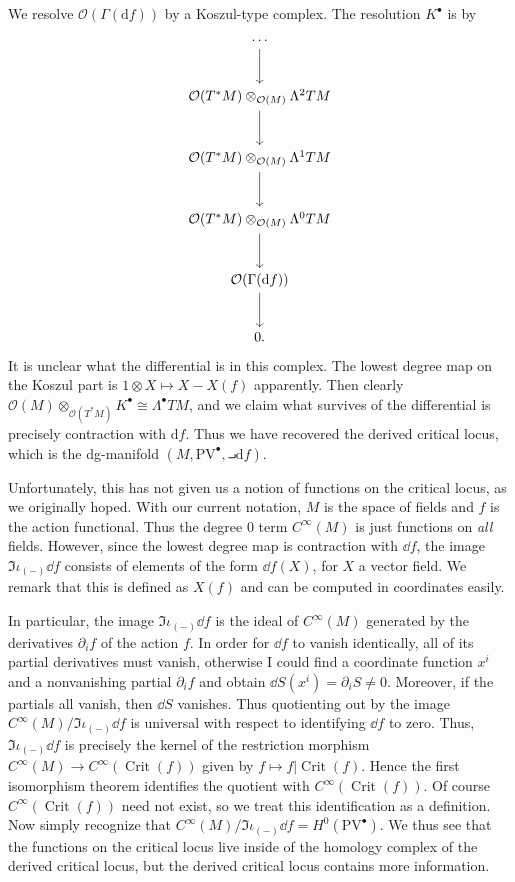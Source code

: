 We resolve $\mathcal{O} (\Gamma (\mathrm{d} f))$ by a Koszul-type complex. The resolution $K^{\bullet} $ is by
\[\begin{tikzcd}[row sep = 2.5em, column sep = 2.5em]
	\cdots \ar[d]  \\
	\mathcal{O} (T^*M)\otimes_{\mathcal{O} (M)} \Lambda ^2TM\ar[d] \\
	\mathcal{O} (T^*M)\otimes _{\mathcal{O} (M)} \Lambda ^1TM\ar[d]  \\
	\mathcal{O} (T^*M)\otimes _{\mathcal{O} (M)} \Lambda ^0TM\ar[d] \\
	\mathcal{O} (\Gamma (\mathrm{d} f))\ar[d] \\
	0.
\end{tikzcd}\]
It is unclear what the differential is in this complex. The lowest degree map on the Koszul part is $1\otimes X\mapsto X-X(f)$ apparently. Then clearly $\mathcal{O} (M)\otimes_{\mathcal{O} (T^*M)} K^{\bullet} \cong \Lambda ^{\bullet} TM$, and we claim what survives of the differential is precisely contraction with $\mathrm{d} f$. Thus we have recovered the derived critical locus, which is the dg-manifold $(M, \mathrm{PV} ^{\bullet} , \intprod \mathrm{d} f)$.

Unfortunately, this has not given us a notion of functions on the critical locus, as we originally hoped. With our current notation, $M$ is the space of fields and $f$ is the action functional. Thus the degree 0 term $C^\infty (M)$ is just functions on \emph{all} fields. However, since the lowest degree map is contraction with $\dd f$, the image $\Im \iota _{(-)} \dd f$ consists of elements of the form $\dd f(X)$, for $X$ a vector field. We remark that this is defined as $X(f)$ and can be computed in coordinates easily.

In particular, the image $\Im \iota _{(-)} \dd f$ is the ideal of $C^\infty (M)$ generated by the derivatives $\partial _if$ of the action $f$. In order for $\dd f$ to vanish identically, all of its partial derivatives must vanish, otherwise I could find a coordinate function $x^i$ and a nonvanishing partial $\partial _if$ and obtain $\dd S(x^i)= \partial _iS \neq 0$. Moreover, if the partials all vanish, then $\dd S$ vanishes. Thus quotienting out by the image $C^\infty (M) / \Im \iota _{(-)} \dd f$ is universal with respect to identifying $\dd f$ to zero. Thus, $\Im \iota _{(-)} \dd f$ is precisely the kernel of the restriction morphism $C^\infty (M) \to C^\infty (\operatorname{Crit} (f))$ given by $f\mapsto f|\operatorname{Crit} (f)$. Hence the first isomorphism theorem identifies the quotient with $C^\infty (\operatorname{Crit} (f))$. Of course $C^\infty (\operatorname{Crit} (f))$ need not exist, so we treat this identification as a definition. Now simply recognize that $C^\infty (M) / \Im \iota _{(-)} \dd f = H^0(\mathrm{PV} ^{\bullet} )$. We thus see that the functions on the critical locus live inside of the homology complex of the derived critical locus, but the derived critical locus contains more information.

